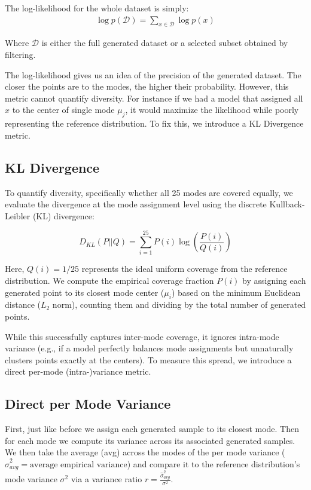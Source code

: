 The log-likelihood for the whole dataset is simply:
\begin{align}
    \log p(\mathcal{D}) = \sum_{x \in \mathcal{D}} \log p(x)
\end{align}

Where $\mathcal{D}$ is either the full generated dataset or a selected subset obtained by filtering.

The log-likelihood gives us an idea of the precision of the generated dataset. The closer the points are to the modes, the higher their probability. However, this metric cannot quantify diversity. For instance if we had a model that assigned all $x$ to the center of single mode $\mu_j$, it would maximize the likelihood while poorly representing the reference distribution.
To fix this, we introduce a KL Divergence metric.

\subsection{KL Divergence}
To quantify diversity, specifically whether all 25 modes are covered equally, we evaluate the divergence at the mode assignment level using the discrete Kullback-Leibler (KL) divergence:

$$D_{KL}(P || Q)=\sum_{i=1}^{25}P(i)\log\left(\frac{P(i)}{Q(i)}\right)$$

Here, $Q(i)=1/25$ represents the ideal uniform coverage from the reference distribution. We compute the empirical coverage fraction $P(i)$ by assigning each generated point to its closest mode center ($\mu_i$) based on the minimum Euclidean distance ($L_2$ norm), counting them and dividing by the total number of generated points.

While this successfully captures inter-mode coverage, it ignores intra-mode variance (e.g., if a model perfectly balances mode assignments but unnaturally clusters points exactly at the centers). To measure this spread, we introduce a direct per-mode (intra-)variance metric.

\subsection{Direct per Mode Variance}

First, just like before we assign each generated sample to its closest mode. Then for each mode we compute its variance across its associated generated samples. We then take the average (avg) across the modes of the per mode variance ($\hat{\sigma}_{avg}^2 = \text{average empirical variance}$) and compare it to the reference distribution's mode variance $\sigma^2$ via a variance ratio $r=\frac{\hat{\sigma}_{avg}^2}{\sigma^2}$.

